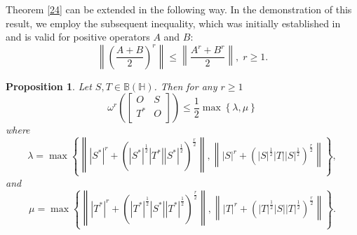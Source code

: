 \documentclass[12pt,twoside,reqno]{amsart}
\newtheorem{proposition}{Proposition}[section]
\numberwithin{equation}{section}
\begin{document}
Theorem \ref{24} can be extended in the following way. In the demonstration of this result, we employ the subsequent inequality, which was initially established in \cite{AS} and is valid for positive operators $A$ and $B$:
\[\left\| {{\left( \frac{A+B}{2} \right)}^{r}} \right\|\le \left\| \frac{{{A}^{r}}+{{B}^{r}}}{2} \right\|,\;r\ge 1.\]
\begin{proposition}\label{4}
Let $S, T\in \mathbb B\left( \mathbb H \right)$. Then for any $r\ge 1$
\[{{\omega }^{r}}\left( \left[ \begin{matrix}
   O & S  \\
   {{T}^{*}} & O  \\
\end{matrix} \right] \right)\le \frac{1}{2}\max \left\{ \lambda ,\mu  \right\}\]
where
\[\lambda =\max \left\{ \left\| {{\left| {{S}^{*}} \right|}^{r}}+{{\left( {{\left| {{S}^{*}} \right|}^{\frac{1}{2}}}\left| {{T}^{*}} \right|{{\left| {{S}^{*}} \right|}^{\frac{1}{2}}} \right)}^{\frac{r}{2}}} \right\|,\left\| {{\left| S \right|}^{r}}+{{\left( {{\left| S \right|}^{\frac{1}{2}}}\left| T \right|{{\left| S \right|}^{\frac{1}{2}}} \right)}^{\frac{r}{2}}} \right\| \right\},\]
and
\[\mu =\max \left\{ \left\| {{\left| {{T}^{*}} \right|}^{r}}+{{\left( {{\left| {{T}^{*}} \right|}^{\frac{1}{2}}}\left| {{S}^{*}} \right|{{\left| {{T}^{*}} \right|}^{\frac{1}{2}}} \right)}^{\frac{r}{2}}} \right\|,\left\| {{\left| T \right|}^{r}}+{{\left( {{\left| T \right|}^{\frac{1}{2}}}\left| S \right|{{\left| T \right|}^{\frac{1}{2}}} \right)}^{\frac{r}{2}}} \right\| \right\}.\]
\end{proposition}
\end{document}
